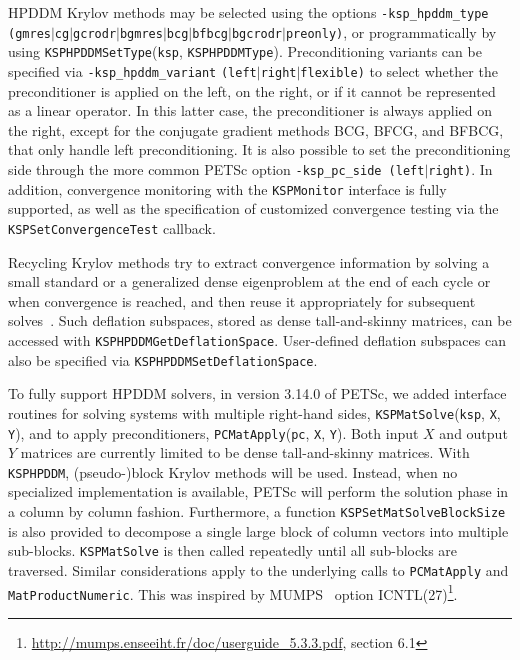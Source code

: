 \documentclass[3p,11pt]{elsarticle}
\newcommand{\pk}[1]{\texttt{#1}}
\begin{document}
HPDDM Krylov methods may be selected using the %
options \pk{-ksp\_hpddm\_type}
\pk{(gmres$|$cg$|$gcrodr$|$bgmres$|$bcg$|$bfbcg$|$bgcrodr$|$preonly)}, or programmatically 
by using \pk{KSPHPDDMSetType}(\pk{ksp}, \pk{KSPHPDDMType}).
Preconditioning variants can be specified via
\pk{-ksp\_hpddm\_variant} \pk{(left$|$right$|$flexible)} to select whether the
preconditioner is applied on the left, on the right, or if it cannot be
represented as a linear operator. In this latter case, the preconditioner is
always applied on the right, except for the conjugate gradient methods BCG, 
BFCG, and BFBCG, that only handle left preconditioning.  It is also
possible to set the preconditioning side through the more common PETSc option
\pk{-ksp\_pc\_side (left$|$right)}.  In addition, convergence monitoring with the
\pk{KSPMonitor} interface is fully supported, as well as the specification of
customized convergence testing via the \pk{KSPSetConvergenceTest} callback.

Recycling Krylov methods try to
extract convergence information by solving a small standard or a generalized
dense eigenproblem at the end of each cycle or when convergence is reached, and
then reuse it appropriately for subsequent
solves~\cite{saad2000deflated,stathopoulos2009deflation,soodhalter2014krylov}.
Such deflation subspaces, stored as dense tall-and-skinny matrices, can be accessed with \pk{KSPHPDDMGetDeflationSpace}. User-defined deflation subspaces can also be specified via \pk{KSPHPDDMSetDeflationSpace}.

To fully support HPDDM solvers, in version 3.14.0 of PETSc, we added interface routines
for solving systems with multiple right-hand sides, \pk{KSPMatSolve}(\pk{ksp}, \pk{X}, \pk{Y}),
and to apply preconditioners, \pk{PCMatApply}(\pk{pc}, \pk{X}, \pk{Y}).
Both input $X$ and output $Y$ matrices are currently limited to be dense tall-and-skinny matrices.
With \pk{KSPHPDDM}, \mbox{(pseudo-)block} Krylov methods will be used. Instead, when no specialized implementation
is available, PETSc will perform the solution phase
in a column by column fashion.
Furthermore, a function \pk{KSPSetMatSolveBlockSize} is also provided to
decompose a single large block of column vectors into multiple sub-blocks.
\pk{KSPMatSolve} is then called repeatedly until all sub-blocks are traversed.
Similar considerations apply to the underlying calls to \pk{PCMatApply} and \pk{MatProductNumeric}.
This was inspired by MUMPS~\cite{amestoy2001fully} option
ICNTL(27)\footnote{\url{http://mumps.enseeiht.fr/doc/userguide_5.3.3.pdf},
section 6.1}.
\end{document}
